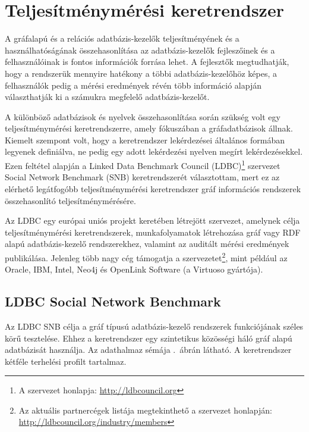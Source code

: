 \chapter{Teljesítménymérési keretrendszer}\label{sec:keretrendszer}

A gráfalapú és a relációs adatbázis-kezelők teljesítményének és a használhatóságának összehasonlítása az adatbázis-kezelők fejleszőinek és a felhasználóinak is fontos információk forrása lehet. A fejlesztők megtudhatják, hogy a rendszerük mennyire hatékony a többi adatbázis-kezelőhöz képes, a felhasználók pedig a mérési eredmények révén több információ alapján választhatják ki a számukra megfelelő adatbázis-kezelőt.

A különböző adatbázisok és nyelvek összehasonlítása során szükség volt egy teljesítménymérési keretrendszerre, amely fókuszában a gráfadatbázisok állnak. Kiemelt szempont volt, hogy a keretrendszer lekérdezései általános formában legyenek definiálva, ne pedig egy adott lekérdezési nyelven megírt lekérdezésekkel. Ezen feltétel alapján a Linked Data Benchmark Council (LDBC)\footnote{A szervezet honlapja: \url{http://ldbcouncil.org}} szervezet Social Network Benchmark (SNB) keretrendszerét választottam, mert ez az elérhető legátfogóbb teljesítménymérési keretrendszer gráf információs rendszerek összehasonlító teljesítménymérésére.

Az LDBC egy európai uniós projekt keretében létrejött szervezet, amelynek célja teljesítménymérési keretrendszerek, munkafolyamatok létrehozása gráf vagy RDF alapú adatbázis-kezelő rendszerekhez, valamint az auditált mérési eredmények publikálása. Jelenleg több nagy cég támogatja a szervezetet\footnote{Az aktuális partnercégek listája megtekinthető a szervezet honlapján: \url{http://ldbcouncil.org/industry/members}}, mint például az Oracle, IBM, Intel, Neo4j és OpenLink Software (a Virtuoso gyártója).

\section{LDBC Social Network Benchmark}

Az LDBC SNB célja a gráf típusú adatbázis-kezelő rendszerek funkciójának széles körű tesztelése. Ehhez a keretrendszer egy szintetikus közösségi háló gráf alapú adatbázisát használja. Az adathalmaz sémája .~ábrán látható. A keretrendszer kétféle terhelési profilt tartalmaz.

